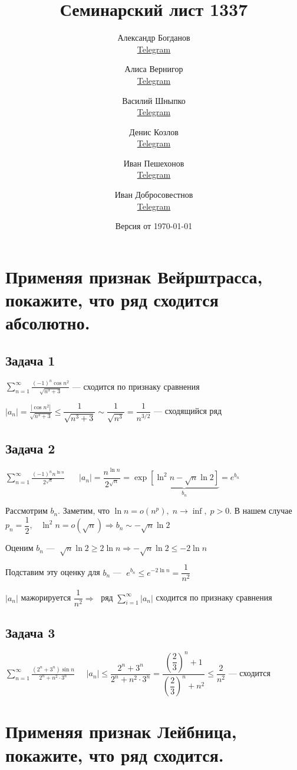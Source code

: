 \documentclass[a4paper,fleqn]{article}
\title{Семинарский лист 1337}
\author{
    Александр Богданов \\ \href{https://t.me/SphericalPotatoInVacuum}{Telegram} \and
    Алиса Вернигор     \\ \href{https://t.me/allisyonok}{Telegram} \and
    Василий Шныпко     \\ \href{https://t.me/yourvash}{Telegram} \and
    Денис Козлов       \\ \href{https://t.me/DKozl50}{Telegram} \and
    Иван Пешехонов     \\ \href{https://t.me/JohanDDC}{Telegram}\and
	  Иван Добросовестнов \\ \href{https://t.me/ivankot13}{Telegram}
}
\date{Версия от {\ddmmyyyydate\today} \currenttime}
\begin{document}
    \maketitle
    \section*{Применяя признак Вейрштрасса, покажите, что ряд сходится абсолютно.}
    \subsection*{Задача 1}
		$ \sum_{n=1}^{\infty} \frac{(-1)^{n} \cos n^{2}}{\sqrt{n^{3}+3}} $ --- сходится по признаку сравнения
		
		$ |a_n| = \frac{|\cos n^{2}|}{\sqrt{n^{3}+3}} \leq \dfrac{1}{\sqrt{n^{3}+3}} \sim \dfrac{1}{\sqrt{n^3}} = \dfrac{1}{n^{3/2}} $ --- сходящийся ряд
	
    \subsection*{Задача 2}
		$ \sum_{n=1}^{\infty} \frac{(-1)^{n} n^{\ln n}}{2^{\sqrt{n}}} $
		$\; \; \; \; \;  |a_n| = \dfrac{n^{\ln n}}{2^{\sqrt{n}}} = \exp \underbrace{\left[\ln^2 n - \sqrt{n}\ln 2\right]}_{b_n}  = e^{b_n}$
		
		Рассмотрим $ b_n $.
		Заметим, что $ \ln n  = o(n^p), \; n \to \inf, \; p>0$. В нашем случае $ p_n = \dfrac{1}{2}, \; \; \; \ln^2n = o(\sqrt{n}) \Rightarrow b_n \sim -\sqrt{n}\ln 2$ 
		
		Оценим $ b_n $   --- $ \; \sqrt{n}\ln2 \geq 2 \ln n \Rightarrow -\sqrt{n}\ln 2 \leq -2\ln n$
		
		Подставим эту оценку для $ b_n $ --- $\; e^{b_n} \leq e^{-2\ln n}  = \dfrac{1}{n^2}$ 
		
		$ |a_n| $ мажорируется $ \dfrac{1}{n^2} \Rightarrow \;$ ряд $ \sum_{i = 1}^{\infty} |a_n|$ сходится по признаку сравнения 

	\subsection*{Задача 3}
		$ \sum_{n=1}^{\infty} \frac{\left(2^{n}+3^{n}\right) \sin n}{2^{n}+n^{2} \cdot 3^{n}} \; \; \; \; \; |a_n| \leq \dfrac{2^n + 3^n}{2^n + n^2\cdot 3^n}  = \dfrac{\left(\dfrac{2}{3}\right)^n+1 }{\left(\dfrac{2}{3}\right)^n + n^2} \leq\dfrac{2}{n^2}$ --- сходится
	\section*{Применяя признак Лейбница, покажите, что ряд сходится.}
\end{document}
